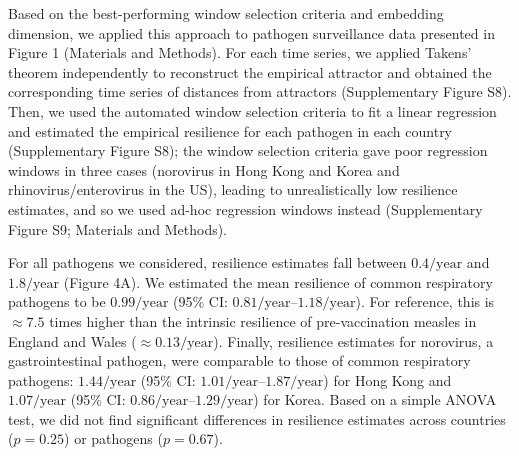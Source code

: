 \documentclass[12pt]{article}
\begin{document}
Based on the best-performing window selection criteria and embedding dimension, we applied this approach to pathogen surveillance data presented in Figure 1 (Materials and Methods).
For each time series, we applied Takens' theorem independently to reconstruct the empirical attractor and obtained the corresponding time series of distances from attractors (Supplementary Figure S8).
Then, we used the automated window selection criteria to fit a linear regression and estimated the empirical resilience for each pathogen in each country (Supplementary Figure S8);
the window selection criteria gave poor regression windows in three cases (norovirus in Hong Kong and Korea and rhinovirus/enterovirus in the US), leading to unrealistically low resilience estimates, and so we used ad-hoc regression windows instead (Supplementary Figure S9; Materials and Methods).

For all pathogens we considered, resilience estimates fall between $0.4/\mathrm{year}$ and $1.8/\mathrm{year}$ (Figure 4A).
We estimated the mean resilience of common respiratory pathogens to be $0.99/\mathrm{year}$ (95\% CI: $0.81/\mathrm{year}$--$1.18/\mathrm{year}$).
For reference, this is $\approx 7.5$ times higher than the intrinsic resilience of pre-vaccination measles in England and Wales ($\approx 0.13/\mathrm{year}$).
Finally, resilience estimates for norovirus, a gastrointestinal pathogen, were comparable to those of common respiratory pathogens: $1.44/\mathrm{year}$ (95\% CI: $1.01/\mathrm{year}$--$1.87/\mathrm{year}$) for Hong Kong and $1.07/\mathrm{year}$ (95\% CI: $0.86/\mathrm{year}$--$1.29/\mathrm{year}$) for Korea.
Based on a simple ANOVA test, we did not find significant differences in resilience estimates across countries ($p=0.25$) or pathogens ($p=0.67$).
\end{document}

